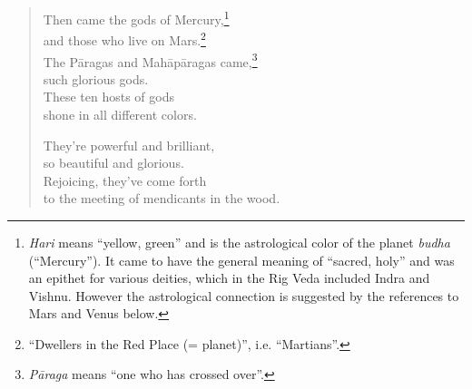 \documentclass[12pt,openany]{book}%
\begin{document}
\begin{verse}
Then came the gods of Mercury,\footnote{\textit{Hari} means “yellow, green” and is the astrological color of the planet \textit{budha} (“Mercury”). It came to have the general meaning of “sacred, holy” and was an epithet for various deities, which in the Rig Veda included Indra and Vishnu. However the astrological connection is suggested by the references to Mars and Venus below. } \\
and those who live on Mars.\footnote{“Dwellers in the Red Place (= planet)”, i.e. “Martians”. } \\
The \textsanskrit{Pāragas} and \textsanskrit{Mahāpāragas} came,\footnote{\textit{\textsanskrit{Pāraga}} means “one who has crossed over”. } \\
such glorious gods. \\
These ten hosts of gods \\
shone in all different colors. 

They’re powerful and brilliant, \\
so beautiful and glorious. \\
Rejoicing, they’ve come forth \\
to the meeting of mendicants in the wood. 


\end{verse}
\end{document}
